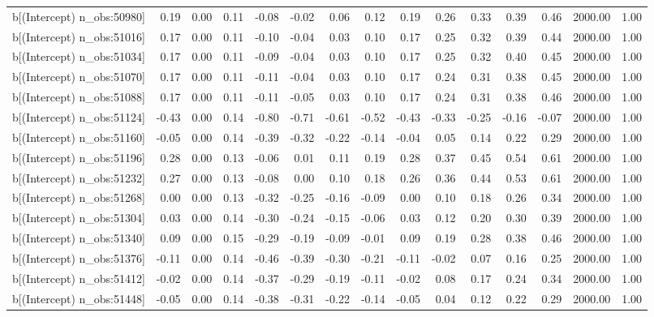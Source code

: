 \begin{table}[ht]
\begin{tabular}{rrrrrrrrrrrrrrr}
  b[(Intercept) n\_obs:50980] & 0.19 & 0.00 & 0.11 & -0.08 & -0.02 & 0.06 & 0.12 & 0.19 & 0.26 & 0.33 & 0.39 & 0.46 & 2000.00 & 1.00 \\ 
  b[(Intercept) n\_obs:51016] & 0.17 & 0.00 & 0.11 & -0.10 & -0.04 & 0.03 & 0.10 & 0.17 & 0.25 & 0.32 & 0.39 & 0.44 & 2000.00 & 1.00 \\ 
  b[(Intercept) n\_obs:51034] & 0.17 & 0.00 & 0.11 & -0.09 & -0.04 & 0.03 & 0.10 & 0.17 & 0.25 & 0.32 & 0.40 & 0.45 & 2000.00 & 1.00 \\ 
  b[(Intercept) n\_obs:51070] & 0.17 & 0.00 & 0.11 & -0.11 & -0.04 & 0.03 & 0.10 & 0.17 & 0.24 & 0.31 & 0.38 & 0.45 & 2000.00 & 1.00 \\ 
  b[(Intercept) n\_obs:51088] & 0.17 & 0.00 & 0.11 & -0.11 & -0.05 & 0.03 & 0.10 & 0.17 & 0.24 & 0.31 & 0.38 & 0.46 & 2000.00 & 1.00 \\ 
  b[(Intercept) n\_obs:51124] & -0.43 & 0.00 & 0.14 & -0.80 & -0.71 & -0.61 & -0.52 & -0.43 & -0.33 & -0.25 & -0.16 & -0.07 & 2000.00 & 1.00 \\ 
  b[(Intercept) n\_obs:51160] & -0.05 & 0.00 & 0.14 & -0.39 & -0.32 & -0.22 & -0.14 & -0.04 & 0.05 & 0.14 & 0.22 & 0.29 & 2000.00 & 1.00 \\ 
  b[(Intercept) n\_obs:51196] & 0.28 & 0.00 & 0.13 & -0.06 & 0.01 & 0.11 & 0.19 & 0.28 & 0.37 & 0.45 & 0.54 & 0.61 & 2000.00 & 1.00 \\ 
  b[(Intercept) n\_obs:51232] & 0.27 & 0.00 & 0.13 & -0.08 & 0.00 & 0.10 & 0.18 & 0.26 & 0.36 & 0.44 & 0.53 & 0.61 & 2000.00 & 1.00 \\ 
  b[(Intercept) n\_obs:51268] & 0.00 & 0.00 & 0.13 & -0.32 & -0.25 & -0.16 & -0.09 & 0.00 & 0.10 & 0.18 & 0.26 & 0.34 & 2000.00 & 1.00 \\ 
  b[(Intercept) n\_obs:51304] & 0.03 & 0.00 & 0.14 & -0.30 & -0.24 & -0.15 & -0.06 & 0.03 & 0.12 & 0.20 & 0.30 & 0.39 & 2000.00 & 1.00 \\ 
  b[(Intercept) n\_obs:51340] & 0.09 & 0.00 & 0.15 & -0.29 & -0.19 & -0.09 & -0.01 & 0.09 & 0.19 & 0.28 & 0.38 & 0.46 & 2000.00 & 1.00 \\ 
  b[(Intercept) n\_obs:51376] & -0.11 & 0.00 & 0.14 & -0.46 & -0.39 & -0.30 & -0.21 & -0.11 & -0.02 & 0.07 & 0.16 & 0.25 & 2000.00 & 1.00 \\ 
  b[(Intercept) n\_obs:51412] & -0.02 & 0.00 & 0.14 & -0.37 & -0.29 & -0.19 & -0.11 & -0.02 & 0.08 & 0.17 & 0.24 & 0.34 & 2000.00 & 1.00 \\ 
  b[(Intercept) n\_obs:51448] & -0.05 & 0.00 & 0.14 & -0.38 & -0.31 & -0.22 & -0.14 & -0.05 & 0.04 & 0.12 & 0.22 & 0.29 & 2000.00 & 1.00 \\ 

\end{tabular}
\end{table}
